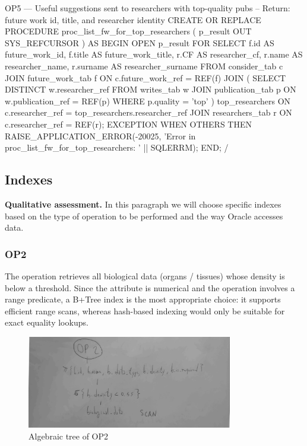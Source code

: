 \documentclass[11pt,a4paper]{article}
\begin{document}
\begin{sqlbox}{OP5 — Useful suggestions sent to researchers with top-quality pubs}
-- Return: future work id, title, and researcher identity
CREATE OR REPLACE PROCEDURE proc_list_fw_for_top_researchers (
  p_result OUT SYS_REFCURSOR
) AS
BEGIN
  OPEN p_result FOR
    SELECT
      f.id      AS future_work_id,
      f.title   AS future_work_title,
      r.CF      AS researcher_cf,
      r.name    AS researcher_name,
      r.surname AS researcher_surname
    FROM consider_tab c
    JOIN future_work_tab f
      ON c.future_work_ref = REF(f)
    JOIN (
        SELECT DISTINCT w.researcher_ref
        FROM writes_tab w
        JOIN publication_tab p
          ON w.publication_ref = REF(p)
        WHERE p.quality = 'top'
    ) top_researchers
      ON c.researcher_ref = top_researchers.researcher_ref
    JOIN researchers_tab r
      ON c.researcher_ref = REF(r);
EXCEPTION
  WHEN OTHERS THEN
    RAISE_APPLICATION_ERROR(-20025, 'Error in proc_list_fw_for_top_researchers: ' || SQLERRM);
END;
/ 
\end{sqlbox}

\subsection{Indexes}

\textbf{Qualitative assessment.} In this paragraph we will choose specific indexes based on the type of operation to be performed and the way Oracle accesses data.

\subsubsection*{OP2}

The operation retrieves all biological data (organs / tissues) whose density is below a threshold. Since the attribute is numerical and the operation involves a range predicate, a B+Tree index is the most appropriate choice: it supports efficient range scans, whereas hash-based indexing would only be suitable for exact equality lookups.  

\begin{figure}[H]
  \centering
  \includegraphics[width=0.8\textwidth]{img/op2_algebra.png}
  \caption{Algebraic tree of OP2}
\end{figure}
\end{document}
